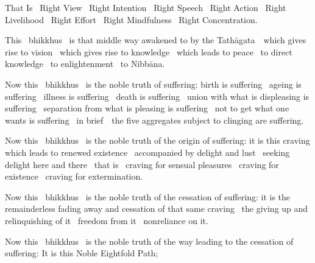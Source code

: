 \begin{english-hang}
  That Is \breathmark\ Right View \breathmark\ Right Intention \breathmark\ Right Speech \breathmark\ Right Action \breathmark\ Right Livelihood \breathmark\ Right Effort \breathmark\ Right Mindfulness \breathmark\ Right Concentration.
\end{english-hang}

\begin{english-hang}
  This \breathmark\ bhikkhus \breathmark\ is that middle way awakened to by the \mbox{Tathāgata}~\breathmark\ which gives rise to vision \breathmark\ which gives rise to knowledge \breathmark\ which leads to peace \breathmark\ to direct knowledge \breathmark\ to enlightenment \breathmark\ to Nibbāna.
\end{english-hang}

\begin{english-hang}
  Now this \breathmark\ bhikkhus \breathmark\ is the noble truth of suffering: birth is suffering \breathmark\ ageing is suffering \breathmark\ illness is suffering \breathmark\ death is suffering \breathmark\ union with what is displeasing is suffering \breathmark\ separation from what is pleasing is suffering \breathmark\ not to get what one wants is suffering \breathmark\ in \mbox{brief}~\breathmark\ the five aggregates subject to clinging are suffering.
\end{english-hang}

\begin{english-hang}
  Now this \breathmark\ bhikkhus \breathmark\ is the noble truth of the origin of suffering: it is this craving which leads to renewed existence \breathmark\ accompanied by delight and lust \breathmark\ seeking delight here and there \breathmark\ that is \breathmark\ craving for sensual pleasures \breathmark\ craving for existence \breathmark\ craving for extermination.
\end{english-hang}

\begin{english-hang}
  Now this \breathmark\ bhikkhus \breathmark\ is the noble truth of the cessation of suffering: it is the remainderless fading away and cessation of that same craving \breathmark\ the giving up and relinquishing of it \breathmark\ freedom from it \breathmark\ nonreliance on it.
\end{english-hang}

\begin{english-hang}
  Now this \breathmark\ bhikkhus \breathmark\ is the noble truth of the way leading to the cessation of suffering: It is this Noble Eightfold Path;
\end{english-hang}

